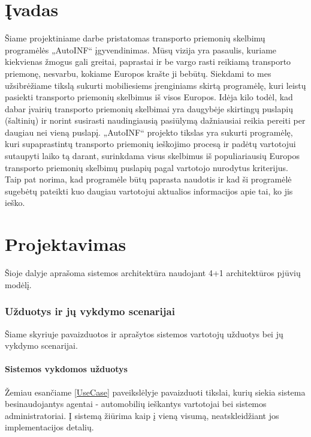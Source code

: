\documentclass[12pt]{article}
\begin{document}
	\part*{Įvadas}
	Šiame projektiniame darbe pristatomas transporto priemonių skelbimų programėlės „AutoINF“ įgyvendinimas. Mūsų vizija yra pasaulis, kuriame kiekvienas žmogus gali greitai, paprastai ir be vargo rasti reikiamą transporto priemonę, nesvarbu, kokiame Europos krašte ji bebūtų. Siekdami to mes užsibrėžiame tikslą sukurti mobiliesiems įrenginiams skirtą programėlę, kuri leistų pasiekti transporto priemonių skelbimus iš visos Europos. Idėja kilo todėl, kad dabar įvairių transporto priemonių skelbimai yra daugybėje skirtingų puslapių (šaltinių) ir norint susirasti naudingiausią pasiūlymą dažniausiai reikia pereiti per daugiau nei vieną puslapį. „AutoINF“ projekto tikslas yra sukurti programėlę, kuri supaprastintų transporto priemonių ieškojimo procesą ir padėtų vartotojui sutaupyti laiko tą darant, surinkdama visus skelbimus iš populiariausių Europos transporto priemonių skelbimų puslapių pagal vartotojo nurodytus kriterijus. Taip pat norima, kad programėle būtų paprasta naudotis ir kad ši programėlė sugebėtų pateikti kuo daugiau vartotojui aktualios informacijos apie tai, ko jis ieško.
	\pagebreak
	
	\part*{Projektavimas}

	Šioje dalyje aprašoma sistemos architektūra naudojant 4+1 architektūros pjūvių modėlį.
	
	\section{Užduotys ir jų vykdymo scenarijai}
	Šiame skyriuje pavaizduotos ir aprašytos sistemos vartotojų užduotys bei jų vykdymo scenarijai.
	\subsection{Sistemos vykdomos užduotys}
	Žemiau esančiame \ref{UseCase} paveikslėlyje pavaizduoti tikslai, kurių siekia sistema besinaudojantys agentai - automobilių ieškantys vartotojai bei sistemos administratoriai. Į sistemą žiūrima kaip į vieną visumą, neatskleidžiant jos implementacijos detalių.
	
\end{document}
